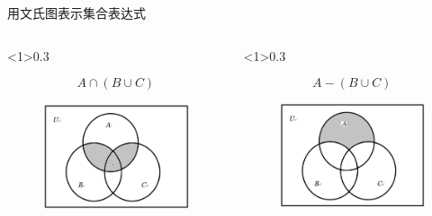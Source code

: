 \documentclass[xetex,10pt,aspectratio=43]{beamer}
\begin{document}
	\begin{frame}{用文氏图表示集合表达式}
		
	\begin{columns}
		
		\begin{column}<1>{0.3\textwidth}
			
			$$A\cap(B\cup C)$$
			
			\begin{figure}
				
				\centering
				
				\includegraphics[scale=0.5]{4.png}
				
			\end{figure}
		
		\end{column}
		
		\begin{column}<1>{0.3\textwidth}
			
			$$A-(B\cup C)$$
			
			\begin{figure}
				
				\centering
				
				\includegraphics[scale=0.5]{17.png}
				

\end{figure}
\end{column}
\end{columns}
\end{frame}
\end{document}
